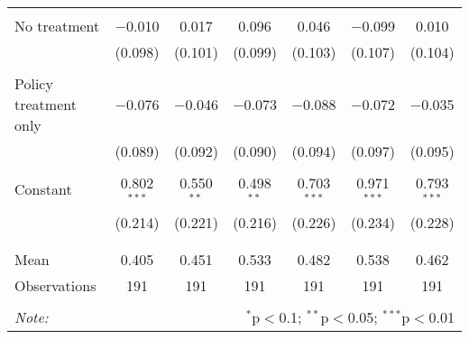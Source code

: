 \begin{tabular}{@{\extracolsep{5pt}}lcccccc}
  & & & & & & \\ 
 No treatment & $-$0.010 & 0.017 & 0.096 & 0.046 & $-$0.099 & 0.010 \\ 
  & (0.098) & (0.101) & (0.099) & (0.103) & (0.107) & (0.104) \\ 
  & & & & & & \\ 
 Policy treatment only & $-$0.076 & $-$0.046 & $-$0.073 & $-$0.088 & $-$0.072 & $-$0.035 \\ 
  & (0.089) & (0.092) & (0.090) & (0.094) & (0.097) & (0.095) \\ 
  & & & & & & \\ 
 Constant & 0.802$^{***}$ & 0.550$^{**}$ & 0.498$^{**}$ & 0.703$^{***}$ & 0.971$^{***}$ & 0.793$^{***}$ \\ 
  & (0.214) & (0.221) & (0.216) & (0.226) & (0.234) & (0.228) \\ 
  & & & & & & \\ 
\hline \\[-1.8ex] 
Mean & 0.405 & 0.451 & 0.533 & 0.482 & 0.538 & 0.462 \\ 
Observations & 191 & 191 & 191 & 191 & 191 & 191 \\ 
\hline 
\hline \\[-1.8ex] 
\textit{Note:}  & \multicolumn{6}{r}{$^{*}$p$<$0.1; $^{**}$p$<$0.05; $^{***}$p$<$0.01} \\ 
\end{tabular} 
